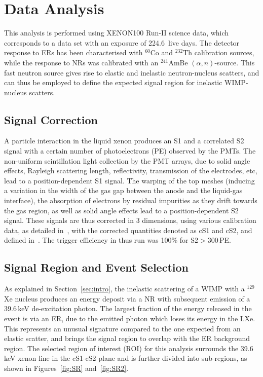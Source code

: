 \section{Data Analysis}
\label{sec:analysis}

This analysis is performed using XENON100 Run-II science data, which corresponds to a data set with an exposure of 224.6~live days. The detector response to
ERs has been characterised with $^{60}$Co and $^{232}$Th calibration sources, while the response to NRs was calibrated with an $^{241}$AmBe $(\alpha,n)$-source. This fast neutron source gives rise to elastic and inelastic neutron-nucleus scatters, and can thus be employed to define the expected signal region for inelastic WIMP-nucleus scatters.

\subsection{Signal Correction} 

A particle interaction in the liquid xenon produces an S1 and a correlated S2 signal with a certain number of photoelectrons (PE) observed by the PMTs. The non-uniform scintillation light collection by the PMT arrays, due to solid angle effects, Rayleigh scattering length, reflectivity, transmission of the electrodes, etc, lead to a position-dependent S1 signal. The warping of the top meshes (inducing a variation in the width of the gas gap between the anode and the liquid-gas interface), the absorption of electrons by residual impurities as they drift towards the gas region, as well as solid angle effects lead to a position-dependent S2 signal. These signals are thus corrected in 3 dimensions, using various calibration data, as detailed in~\cite{Aprile:2011dd,Aprile:2012vw}, with the corrected quantities denoted as cS1 and cS2, and defined in~\cite{Aprile:2012vw}. The trigger efficiency in thus run was 100\% for S2$>$300\,PE.

\subsection{Signal Region and Event Selection} 

As explained in Section~\ref{sec:intro}, the inelastic scattering of a WIMP with a $^{129}$Xe nucleus produces an energy deposit via a NR with subsequent emission of  
a 39.6\,keV de-excitation photon. The largest fraction of the energy released in the event is via an ER, due to the emitted photon which loses its energy in the LXe.
This represents an unusual signature compared to the one expected from an elastic scatter, and brings the signal region to overlap with the ER background region.
The selected region of interest (ROI) for this analysis surrounds the 39.6\,keV xenon line in the cS1-cS2 plane and is further divided into
sub-regions, as shown in Figures~\ref{fig:SR} and~\ref{fig:SR2}.

